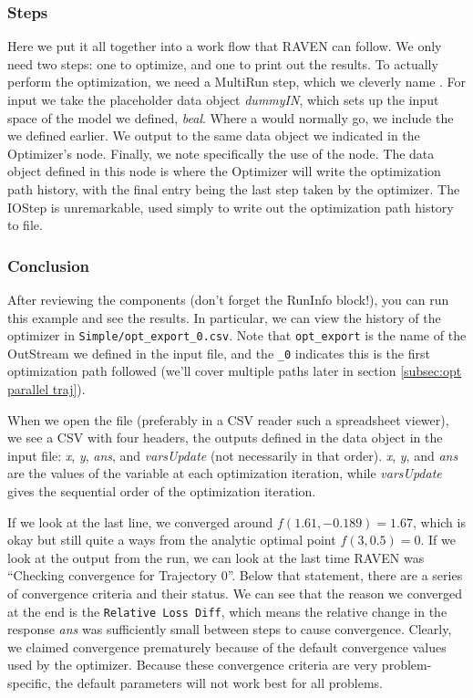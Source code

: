 \subsubsection{Steps}
Here we put it all together into a work flow that RAVEN can follow.  We only need two steps: one to optimize,
and one to print out the results.  To actually perform the optimization, we need a MultiRun step, which we
cleverly name .  For input we take the placeholder data object \emph{dummyIN}, which sets
up the input space of the model we defined, \emph{beal}.  Where a  would normally go, we
include the  we defined earlier.  We output to the same data object we indicated in the
Optimizer's  node.  Finally, we note specifically the use of the
 node.  The data object defined in this node is where the Optimizer will write the
optimization path history, with the final entry being the last step taken by the optimizer.  The IOStep is
unremarkable, used simply to write out the optimization path history to file.

\subsubsection{Conclusion}
After reviewing the components (don't forget the RunInfo block!), you can run this example and see the
results.  In particular, we can view the history of the optimizer in \texttt{Simple/opt\_export\_0.csv}.  Note
that \texttt{opt\_export} is the name of the  OutStream we defined in the input file, and the
\texttt{\_0} indicates this is the first optimization path followed (we'll cover multiple paths later in
section \ref{subsec:opt parallel traj}).

When we open the file (preferably in a CSV reader such a spreadsheet viewer), we see a CSV with four headers,
the outputs defined in the data object in the input
file: \emph{x}, \emph{y}, \emph{ans}, and \emph{varsUpdate} (not necessarily in that order).  \emph{x},
\emph{y}, and \emph{ans} are the values of the variable at each optimization iteration, while
\emph{varsUpdate} gives the sequential order of the optimization iteration.

If we look at the last line, we converged around $f(1.61, -0.189) = 1.67$, which is okay but still quite a
ways from the analytic optimal point $f(3, 0.5) = 0$.  If we look at the output from the run, we can look at
the last time RAVEN was ``Checking convergence for Trajectory 0''.  Below that statement, there are a series
of convergence criteria and their status.  We can see that the reason we converged at the end is the
\texttt{Relative Loss Diff}, which means the relative change in the response \emph{ans} was sufficiently
small between steps to cause convergence.  Clearly, we claimed convergence prematurely because of the default convergence
values used by the optimizer.  Because these convergence criteria are very problem-specific, the default
parameters will not work best for all problems.

